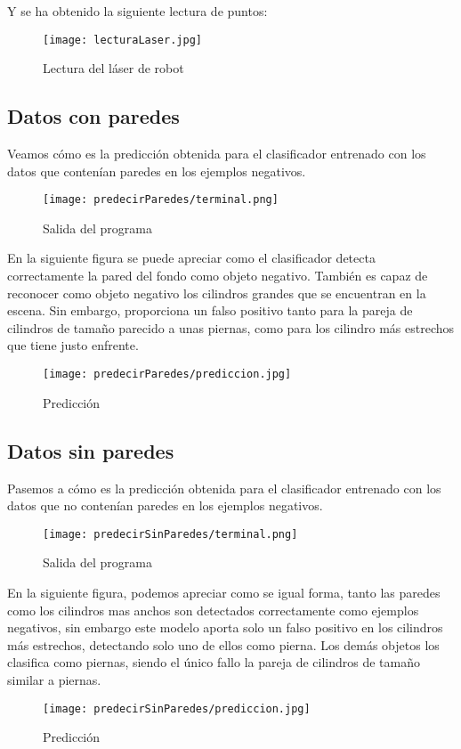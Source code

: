 Y se ha obtenido la siguiente lectura de puntos:

\begin{figure}[H]
	\centering
	\texttt{[image: lecturaLaser.jpg]}
	\caption{Lectura del láser de robot}
\end{figure}

\subsection{Datos con paredes}
Veamos cómo es la predicción obtenida para el clasificador entrenado con los datos que contenían paredes en los ejemplos negativos.

\begin{figure}[H]
	\centering
	\texttt{[image: predecirParedes/terminal.png]}
	\caption{Salida del programa}
\end{figure}

En la siguiente figura se puede apreciar como el clasificador detecta correctamente la pared del fondo como objeto negativo. También es capaz de reconocer como objeto negativo los cilindros grandes que se encuentran en la escena. Sin embargo, proporciona un falso positivo tanto para la pareja de cilindros de tamaño parecido a unas piernas, como para los cilindro más estrechos que tiene justo enfrente.

\begin{figure}[H]
	\centering
	\texttt{[image: predecirParedes/prediccion.jpg]}
	\caption{Predicción}
\end{figure}

\newpage

\subsection{Datos sin paredes}
Pasemos a cómo es la predicción obtenida para el clasificador entrenado con los datos que no contenían paredes en los ejemplos negativos.
\begin{figure}[H]
	\centering
	\texttt{[image: predecirSinParedes/terminal.png]}
	\caption{Salida del programa}
\end{figure}

En la siguiente figura, podemos apreciar como se igual forma, tanto las paredes como los cilindros mas anchos son detectados correctamente como ejemplos negativos, sin embargo este modelo aporta solo un falso positivo en los cilindros más estrechos, detectando solo uno de ellos como pierna. Los demás objetos los clasifica como piernas, siendo el único fallo la pareja de cilindros de tamaño similar a piernas.

\begin{figure}[H]
	\centering
	\texttt{[image: predecirSinParedes/prediccion.jpg]}
	\caption{Predicción}
\end{figure}
